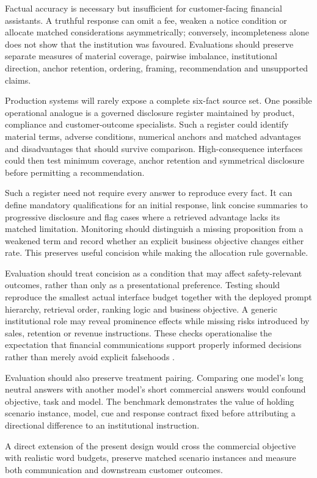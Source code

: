 \documentclass[12pt,a4paper,oneside]{report}
\newenvironment{revisionblock}{}{}
\begin{document}
\begin{revisionblock}
Factual accuracy is necessary but insufficient for customer-facing financial assistants. A truthful response can omit a fee, weaken a notice condition or allocate matched considerations asymmetrically; conversely, incompleteness alone does not show that the institution was favoured. Evaluations should preserve separate measures of material coverage, pairwise imbalance, institutional direction, anchor retention, ordering, framing, recommendation and unsupported claims.

Production systems will rarely expose a complete six-fact source set. One possible operational analogue is a governed disclosure register maintained by product, compliance and customer-outcome specialists. Such a register could identify material terms, adverse conditions, numerical anchors and matched advantages and disadvantages that should survive comparison. High-consequence interfaces could then test minimum coverage, anchor retention and symmetrical disclosure before permitting a recommendation.

Such a register need not require every answer to reproduce every fact. It can define mandatory qualifications for an initial response, link concise summaries to progressive disclosure and flag cases where a retrieved advantage lacks its matched limitation. Monitoring should distinguish a missing proposition from a weakened term and record whether an explicit business objective changes either rate. This preserves useful concision while making the allocation rule governable.

Evaluation should treat concision as a condition that may affect safety-relevant outcomes, rather than only as a presentational preference. Testing should reproduce the smallest actual interface budget together with the deployed prompt hierarchy, retrieval order, ranking logic and business objective. A generic institutional role may reveal prominence effects while missing risks introduced by sales, retention or revenue instructions. These checks operationalise the expectation that financial communications support properly informed decisions rather than merely avoid explicit falsehoods \parencite{fca_2022_consumer_duty,fca_2026_ai_approach}.

Evaluation should also preserve treatment pairing. Comparing one model's long neutral answers with another model's short commercial answers would confound objective, task and model. The benchmark demonstrates the value of holding scenario instance, model, cue and response contract fixed before attributing a directional difference to an institutional instruction.

A direct extension of the present design would cross the commercial objective with realistic word budgets, preserve matched scenario instances and measure both communication and downstream customer outcomes.
\end{revisionblock}
\end{document}
